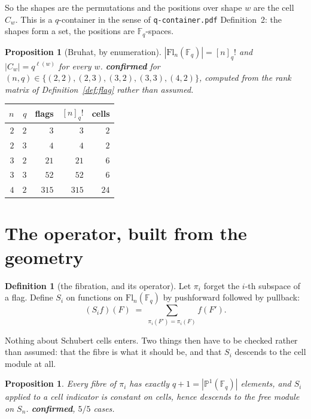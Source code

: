 \documentclass[11pt,a4paper]{article}
\newtheorem{proposition}[theorem]{Proposition}
\theoremstyle{definition}
\newtheorem{definition}[theorem]{Definition}
\theoremstyle{remark}
\newcommand{\FF}{\mathbb{F}}
\newcommand{\Fl}{\mathrm{Fl}}
\newcommand{\OK}{\textcolor{okgreen}{\textbf{confirmed}}}
\begin{document}
So the shapes are the permutations and the positions over shape $w$ are the cell
$C_w$. This is a $q$-container in the sense of \texttt{q-container.pdf}
Definition~2: the shapes form a set, the positions are $\FF_q$-spaces.

\begin{proposition}[Bruhat, by enumeration]\label{prop:bruhat}
$|\Fl_n(\FF_q)| = [n]_q!$ and $|C_w| = q^{\ell(w)}$ for every $w$. \OK{} for
$(n,q) \in \{(2,2),(2,3),(3,2),(3,3),(4,2)\}$, computed from the rank matrix of
Definition~\ref{def:flag} rather than assumed.
\end{proposition}

\begin{center}
\small
\begin{tabular}{rrrrr}
\toprule
$n$ & $q$ & flags & $[n]_q!$ & cells \\
\midrule
$2$ & $2$ & $3$   & $3$   & $2$  \\
$2$ & $3$ & $4$   & $4$   & $2$  \\
$3$ & $2$ & $21$  & $21$  & $6$  \\
$3$ & $3$ & $52$  & $52$  & $6$  \\
$4$ & $2$ & $315$ & $315$ & $24$ \\
\bottomrule
\end{tabular}
\end{center}

\section{The operator, built from the geometry}

\begin{definition}[the fibration, and its operator]\label{def:op}
Let $\pi_i$ forget the $i$-th subspace of a flag. Define $S_i$ on functions on
$\Fl_n(\FF_q)$ by pushforward followed by pullback:
\[
  (S_i f)(F) \;=\; \sum_{\pi_i(F') = \pi_i(F)} f(F').
\]
\end{definition}

Nothing about Schubert cells enters. Two things then have to be checked rather
than assumed: that the fibre is what it should be, and that $S_i$ descends to the
cell module at all.

\begin{proposition}\label{prop:desc}
Every fibre of $\pi_i$ has exactly $q+1 = |\mathbb{P}^1(\FF_q)|$ elements, and
$S_i$ applied to a cell indicator is constant on cells, hence descends to the free
module on $S_n$. \OK{}, $5/5$ cases.
\end{proposition}
\end{document}
